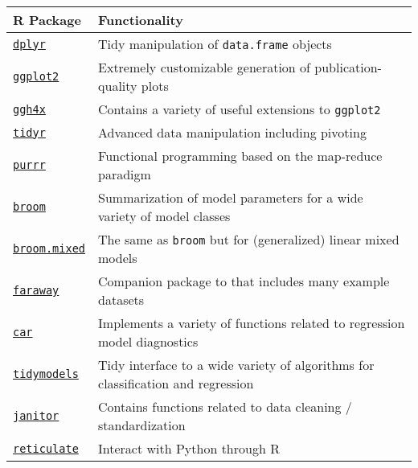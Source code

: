 \documentclass{report}
\begin{document}
\begin{table}[h]
\centering
\begin{tabular}{||l l||} 
 \hline
 \textbf{R Package} & \textbf{Functionality} \\ [0.5ex] 
  \hline\hline
  \href{https://cran.r-project.org/web/packages/dplyr/index.html}{\texttt{dplyr}} & Tidy manipulation of \texttt{data.frame} objects \\
  \hline
  \href{https://cran.r-project.org/web/packages/ggplot2/index.html}{\texttt{ggplot2}} & Extremely customizable generation of publication-quality plots \\
  \hline
  \href{https://cran.r-project.org/web/packages/ggh4x/index.html}{\texttt{ggh4x}} & Contains a variety of useful extensions to \texttt{ggplot2} \\
  \hline
  \href{https://cran.r-project.org/web/packages/tidyr/index.html}{\texttt{tidyr}} & Advanced data manipulation including pivoting \\
  \hline
  \href{https://cran.r-project.org/web/packages/purrr/index.html}{\texttt{purrr}} & Functional programming based on the map-reduce paradigm \\
  \hline
  \href{https://cran.r-project.org/web/packages/broom/index.html}{\texttt{broom}} & Summarization of model parameters for a wide variety of model classes \\
  \hline
  \href{https://cran.r-project.org/web/packages/broom.mixed/index.html}{\texttt{broom.mixed}} & The same as \texttt{broom} but for (generalized) linear mixed models \\
  \hline
  \href{https://cran.r-project.org/web/packages/faraway/index.html}{\texttt{faraway}} & Companion package to \cite{faraway_extending_2016} that includes many example datasets \\
  \hline
  \href{https://cran.r-project.org/web/packages/car/index.html}{\texttt{car}} & Implements a variety of functions related to regression model diagnostics \\
  \hline
  \href{https://cran.r-project.org/web/packages/tidymodels/index.html}{\texttt{tidymodels}} & Tidy interface to a wide variety of algorithms for classification and regression \\
  \hline
  \href{https://cran.r-project.org/web/packages/janitor/index.html}{\texttt{janitor}} & Contains functions related to data cleaning / standardization \\
  \hline
  \href{https://cran.r-project.org/web/packages/reticulate/index.html}{\texttt{reticulate}} & Interact with Python through R \\

\end{tabular}
\end{table}
\end{document}
